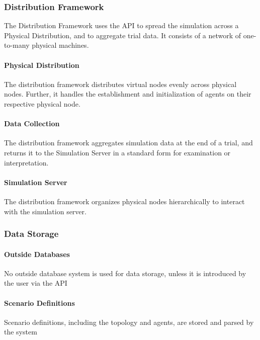 \documentclass[titlepage]{article}
\begin{document}
\subsubsection{Distribution Framework}
	The Distribution Framework uses the API to spread the simulation across a Physical Distribution, and to aggregate trial data. It consists of a network of one-to-many physical machines.
	\paragraph{Physical Distribution} The distribution framework distributes virtual nodes evenly across physical nodes. Further, it handles the establishment and initialization of agents on their respective physical node.
	\paragraph{Data Collection} The distribution framework aggregates simulation data at the end of a trial, and returns it to the Simulation Server in a standard form for examination or interpretation.
	\paragraph{Simulation Server} The distribution framework organizes physical nodes hierarchically to interact with the simulation server.


\subsubsection{Data Storage%
  \label{data-storage}%
}
    \paragraph{Outside Databases} No outside database system is used for data storage, unless it is introduced by the user via the API
    \paragraph{Scenario Definitions} Scenario definitions, including the topology and agents, are stored and parsed by the system

\end{document}
